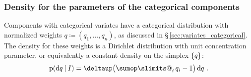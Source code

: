 \documentclass[\ifafour a4paper,12pt,\else a5paper,10pt,\fi%
onecolumn,oneside,article,%
british%
]{memoir}
\makeatletter
\theoremstyle{remark}
\theoremstyle{innote}
\def\sum{\DOTSI\sumop\slimits@}
\newcommand*{\de}{\partialup}%
\newcommand*{\delt}{\deltaup}%
\newcommand*{\di}{\mathrm{d}}%
\newcommand*{\defd}{\coloneqq}
\DeclarePairedDelimiter\set{\{}{\}} %
\newcommand*{\p}{\mathrm{p}}%
\renewcommand*{\|}[1][]{\nonscript\:#1\vert\nonscript\:\mathopen{}}
\newcommand*{\sect}{\S}%
\newcommand*{\tsum}{\mathop{\textstyle\sum}\nolimits}
\makeatother
\begin{document}
\subsubsection{Density for the parameters of the categorical components}
\label{sec:density_categorical}

Components with categorical variates have a categorical distribution with normalized weights $q \defd (q_{1},\dotsc,q_{n})$, as discussed in \sect\,\ref{sec:variates_categorical}. The density for these weights is a Dirichlet distribution with unit concentration parameter, or equivalently a constant density on the simplex $\set{q}$:
\begin{equation}
  \label{eq:density_q_categorical}
  \p(\di q\|I) = \delt\bigl(\tsum_{i}q_{i}-1\bigr)\,\di q \ .
\end{equation}



\medskip



 






\end{document}
